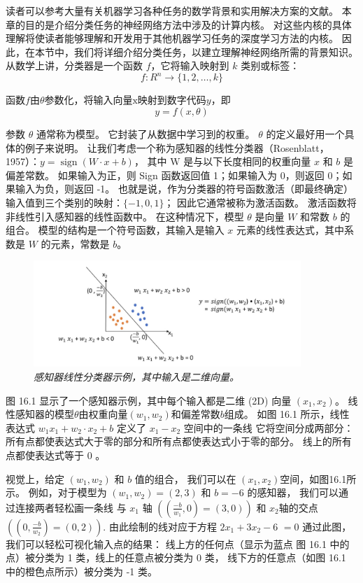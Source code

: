 读者可以参考大量有关机器学习各种任务的数学背景和实用解决方案的文献。 
本章的目的是介绍分类任务的神经网络方法中涉及的计算内核。 
对这些内核的具体理解将使读者能够理解和开发用于其他机器学习任务的深度学习方法的内核。 
因此，在本节中，我们将详细介绍分类任务，以建立理解神经网络所需的背景知识。 
从数学上讲，分类器是一个函数 $f$，它将输入映射到 $k$ 类别或标签：
$$
f: R^{n} \rightarrow\{1,2, \ldots, k\}
$$

函数$f$由$\theta$参数化，将输入向量$\mathrm{x}$映射到数字代码$y$，即
$$
y=f(x, \theta)
$$

参数 $\theta$ 通常称为模型。 它封装了从数据中学习到的权重。 $\theta$ 的定义最好用一个具体的例子来说明。 
让我们考虑一个称为感知器的线性分类器（Rosenblatt，1957）：$y=\operatorname{sign}(W \cdot x+b)$，
其中 $\mathrm{W}$ 是与以下长度相同的权重向量 $x$ 和 $b$ 是偏差常数。 
如果输入为正，则 Sign 函数返回值 1；如果输入为 0，则返回 0；如果输入为负，则返回 -1。 
也就是说，作为分类器的符号函数激活（即最终确定）输入值到三个类别的映射：$\{-1,0,1\}$； 因此它通常被称为激活函数。 
激活函数将非线性引入感知器的线性函数中。 在这种情况下，模型 $\theta$ 是向量 $W$ 和常数 $b$ 的组合。 
模型的结构是一个符号函数，其输入是输入 $x$ 元素的线性表达式，其中系数是 $W$ 的元素，常数是 $b$。

\begin{figure}[H]
	\centering
	\includegraphics[width=0.9\textwidth]{figs/F16.1.png}
	\caption{\textit{感知器线性分类器示例，其中输入是二维向量。}}
\end{figure}

图 16.1 显示了一个感知器示例，其中每个输入都是二维 (2D) 向量 $\left(x_{1}, x_{2}\right)$。 
线性感知器的模型$\theta$由权重向量$\left(w_{1}, w_{2}\right)$和偏差常数$b$组成。 
如图 16.1 所示，线性表达式 $w_{1} x_{1}+w_{2} \cdot x_{2}+b$ 
定义了 $x_{1}-x_{2}$ 空间中的一条线 它将空间分成两部分：所有点都使表达式大于零的部分和所有点都使表达式小于零的部分。 
线上的所有点都使表达式等于 0 。

视觉上，给定 $\left(w_{1}, w_{2}\right)$ 和 $b$ 值的组合，
我们可以在 $\left(x_{1}, x_{2}\right)$空间，如图16.1所示。 
例如，对于模型为 $\left(w_{1}, w_{2}\right)=(2,3)$ 和 $b=-6$ 的感知器，
我们可以通过连接两者轻松画一条线 与 $x_{1}$ 轴 $\left(\left(\frac{-b}{w_{1}}, 0\right)=(3,0)\right)$ 
和 $x_{2}$轴的交点$\left(\left(0, \frac{-b}{w_{2}}\right)=(0,2)\right)$. 
由此绘制的线对应于方程 $2 x_{1}+3 x_{2}-6$ $=0$ 通过此图，我们可以轻松可视化输入点的结果： 
线上方的任何点（显示为蓝点 图 16.1 中的点）被分类为 1 类，线上的任意点被分类为 0 类，
线下方的任意点（如图 16.1 中的橙色点所示）被分类为 -1 类。

